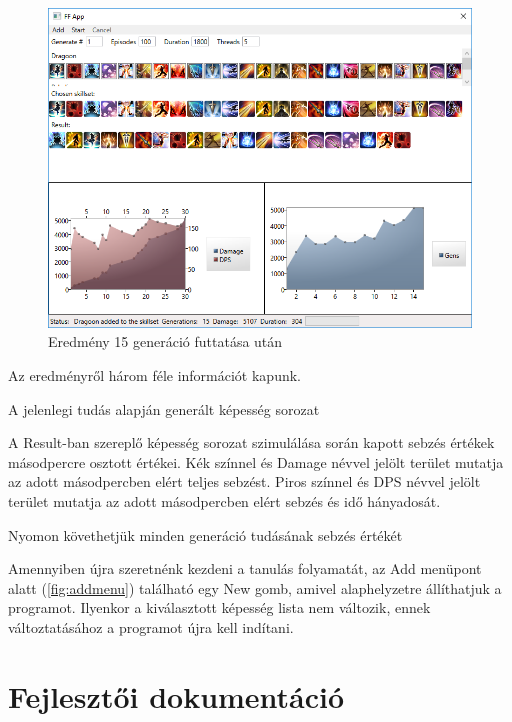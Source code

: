 \documentclass[12pt]{article}
\begin{document}
\begin{figure}[H]
	\begin{center}
		\includegraphics[width=1\textwidth]{15gen}
	\end{center}
	\caption{Eredmény 15 generáció futtatása után}
	\label{fig:15gen}
\end{figure}

Az eredményről három féle információt kapunk. 

\begin{description}[align=left,labelwidth=3cm]
	\item [Result] A jelenlegi tudás alapján generált képesség sorozat
	\item [Bal grafikon] A Result-ban szereplő képesség sorozat szimulálása során kapott sebzés értékek másodpercre osztott értékei. Kék színnel és Damage névvel jelölt terület mutatja az adott másodpercben elért teljes sebzést. Piros színnel és DPS névvel jelölt terület mutatja az adott másodpercben elért sebzés és idő hányadosát.
	\item [Jobb grafikon] Nyomon követhetjük minden generáció tudásának sebzés értékét
\end{description}

Amennyiben újra szeretnénk kezdeni a tanulás folyamatát, az Add menüpont alatt (\ref{fig:addmenu}) található egy New gomb, amivel alaphelyzetre állíthatjuk a programot. Ilyenkor a kiválasztott képesség lista nem változik, ennek változtatásához a programot újra kell indítani.

\section{Fejlesztői dokumentáció}
\end{document}
